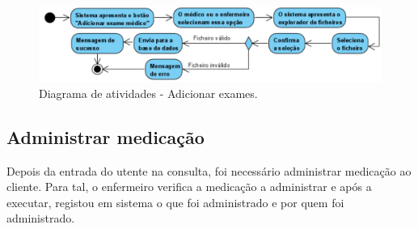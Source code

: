 \documentclass[11pt,a4paper,twoside]{report}
\begin{document}
\begin{figure}[H]
	\centering
	\includegraphics[width=0.7\linewidth]{image/Atividades/AdicionarExame}
	\caption [Diagrama de atividades - Adicionar exames.] {Diagrama de atividades - Adicionar exames.}
	\label{fig:adicionarexame}
\end{figure}


\subsection{Administrar medicação}

Depois da entrada do utente na consulta, foi necessário administrar medicação ao cliente. Para tal, o enfermeiro verifica a medicação a administrar e após a executar, registou em sistema o que foi administrado e por quem foi administrado.
\end{document}
